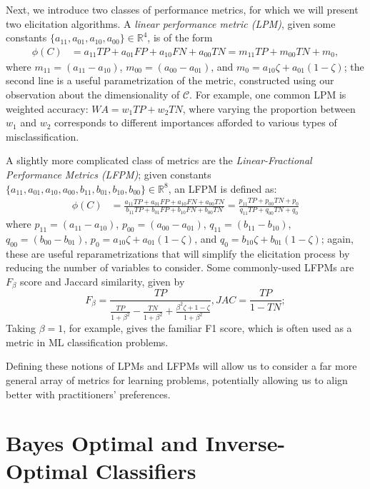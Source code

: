 \documentclass[
  letterpaper,
  DIV=11,
  numbers=noendperiod,
  oneside]{scrreprt}
\theoremstyle{remark}
\begin{document}
Next, we introduce two classes of performance metrics, for which we will
present two elicitation algorithms. A \emph{linear performance metric
(LPM)}, given some constants
\(\{a_{11}, a_{01}, a_{10}, a_{00}\} \in \mathbb{R}^{4}\), is of the
form \[\begin{aligned}
\phi(C) & = a_{11} T P + a_{01} F P + a_{10} F N + a_{00} TN  = m_{11} T P + m_{00} T N + m_{0},
\end{aligned}\] where \(m_{11} = (a_{11} - a_{10})\),
\(m_{00} = (a_{00} - a_{01})\), and
\(m_{0} = a_{10} \zeta + a_{01} (1 - \zeta)\); the second line is a
useful parametrization of the metric, constructed using our observation
about the dimensionality of \(\mathcal{C}\). For example, one common LPM
is weighted accuracy: \(WA = w_1TP + w_2TN\), where varying the
proportion between \(w_1\) and \(w_2\) corresponds to different
importances afforded to various types of misclassification.

A slightly more complicated class of metrics are the
\emph{Linear-Fractional Performance Metrics (LFPM)}; given constants
\(\{a_{11}, a_{01}, a_{10}, a_{00}, b_{11}, b_{01}, b_{10}, b_{00}\} \in \mathbb{R}^{8}\),
an LFPM is defined as: \[\begin{aligned}
\phi(C) & = \frac{a_{11} T P + a_{01} F P + a_{10} F N + a_{00} T N}{b_{11} T P + b_{01} F P + b_{10} F N + b_{00} T N} = \frac{p_{11} T P + p_{00} T N + p_{0}}{q_{11} T P + q_{00} T N + q_{0}}
\end{aligned}\] where \(p_{11} = (a_{11} - a_{10})\),
\(p_{00} = (a_{00} - a_{01})\), \(q_{11} = (b_{11} - b_{10})\),
\(q_{00} = (b_{00} - b_{01})\),
\(p_{0} = a_{10} \zeta + a_{01} (1 - \zeta)\), and
\(q_{0} = b_{10} \zeta + b_{01} (1 - \zeta)\); again, these are useful
reparametrizations that will simplify the elicitation process by
reducing the number of variables to consider. Some commonly-used LFPMs
are \(F_\beta\) score and Jaccard similarity, given by
\[F_{\beta}=\frac{T P}{\frac{T P}{1+\beta^{2}}-\frac{T N}{1+\beta^{2}}+\frac{\beta^{2} \zeta+1-\zeta}{1+\beta^{2}}}, J A C=\frac{T P}{1-T N};\]
Taking \(\beta = 1\), for example, gives the familiar F1 score, which is
often used as a metric in ML classification problems.

Defining these notions of LPMs and LFPMs will allow us to consider a far
more general array of metrics for learning problems, potentially
allowing us to align better with practitioners' preferences.

\section{Bayes Optimal and Inverse-Optimal
Classifiers}\label{bayes-optimal-and-inverse-optimal-classifiers}
\end{document}

